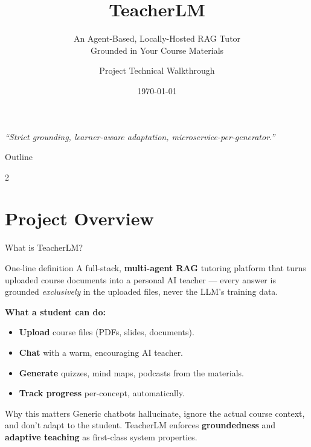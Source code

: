 \documentclass[aspectratio=169, 10pt]{beamer}
\title[TeacherLM]{TeacherLM}
\subtitle{An Agent-Based, Locally-Hosted RAG Tutor \\ Grounded in Your Course Materials}
\author[TeacherLM Team]{Project Technical Walkthrough}
\institute[]{Multi-Agent Architecture $\bullet$ Hybrid Retrieval $\bullet$ Local LLMs}
\date{\today}
\begin{document}

\begin{frame}[plain]
  \titlepage
  \begin{center}
    \scriptsize\itshape
    ``Strict grounding, learner-aware adaptation, microservice-per-generator.''
  \end{center}
\end{frame}

\begin{frame}{Outline}
  \scriptsize
  \begin{multicols}{2}
    \tableofcontents[hideallsubsections]
  \end{multicols}
\end{frame}

\section{Project Overview}

\begin{frame}{What is TeacherLM?}
  \begin{block}{One-line definition}
    A full-stack, \textbf{multi-agent RAG} tutoring platform that turns
    uploaded course documents into a personal AI teacher --- every answer
    is grounded \textit{exclusively} in the uploaded files, never the LLM's
    training data.
  \end{block}

  \vspace{0.2cm}
  \textbf{What a student can do:}
  \begin{itemize}
    \setlength\itemsep{1pt}
    \item \textbf{Upload} course files (PDFs, slides, documents).
    \item \textbf{Chat} with a warm, encouraging AI teacher.
    \item \textbf{Generate} quizzes, mind maps, podcasts from the materials.
    \item \textbf{Track progress} per-concept, automatically.
  \end{itemize}

  \vspace{0.2cm}
  \begin{exampleblock}{Why this matters}
    Generic chatbots hallucinate, ignore the actual course context, and
    don't adapt to the student. TeacherLM enforces \textbf{groundedness}
    and \textbf{adaptive teaching} as first-class system properties.
  \end{exampleblock}
\end{frame}
\end{document}
